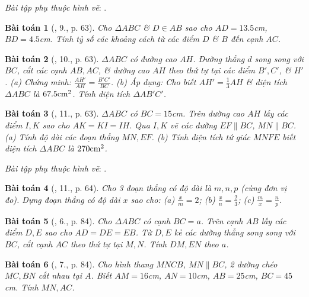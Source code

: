 \documentclass{article}
\newtheorem{baitoan}{Bài toán}
\begin{document}
\textit{Bài tập phụ thuộc hình vẽ}: \cite[?3, 6.--8., pp. 62--63]{SGK_Toan_8_tap_2}.

\begin{baitoan}[\cite{SGK_Toan_8_tap_2}, 9., p. 63]
	Cho $\Delta ABC$ \& $D\in AB$ sao cho $AD = 13.5$\emph{cm}, $BD = 4.5$\emph{cm}. Tính tỷ số các khoảng cách từ các điểm $D$ \& $B$ đến cạnh $AC$.
\end{baitoan}

\begin{baitoan}[\cite{SGK_Toan_8_tap_2}, 10., p. 63]
	$\Delta ABC$ có đường cao $AH$. Đường thẳng $d$ song song với $BC$, cắt các cạnh $AB,AC$, \& đường cao $AH$ theo thứ tự tại các điểm $B',C'$, \& $H'$. (a) Chứng minh: $\frac{AH'}{AH} = \frac{B'C'}{BC}$. (b) Áp dụng: Cho biết $AH' = \frac{1}{3}AH$ \& diện tích $\Delta ABC$ là $67.5{\rm cm}^2$. Tính diện tích $\Delta AB'C'$.
\end{baitoan}

\begin{baitoan}[\cite{SGK_Toan_8_tap_2}, 11., p. 63]
	$\Delta ABC$ có $BC = 15$\emph{cm}. Trên đường cao $AH$ lấy các điểm $I,K$ sao cho $AK = KI = IH$. Qua $I,K$ vẽ các đường $EF\parallel BC$, $MN\parallel BC$. (a) Tính độ dài các đoạn thẳng $MN,EF$. (b) Tính diện tích tứ giác $MNFE$ biết diện tích $\Delta ABC$ là $270{\rm cm}^2$.
\end{baitoan}
\noindent\textit{Bài tập phụ thuộc hình vẽ}: \cite[12.--13., p. 64]{SGK_Toan_8_tap_2}.

\begin{baitoan}[\cite{SGK_Toan_8_tap_2}, 11., p. 64]
	Cho 3 đoạn thẳng có độ dài là $m,n,p$ (cùng đơn vị đo). Dựng đoạn thẳng có độ dài $x$ sao cho: (a) $\frac{x}{m} = 2$; (b) $\frac{x}{n} = \frac{2}{3}$; (c) $\frac{m}{x} = \frac{n}{p}$.
\end{baitoan}

\begin{baitoan}[\cite{SBT_Toan_8_tap_2}, 6., p. 84]
	Cho $\Delta ABC$ có cạnh $BC = a$. Trên cạnh $AB$ lấy các điểm $D,E$ sao cho $AD = DE = EB$. Từ $D,E$ kẻ các đường thẳng song song với $BC$, cắt cạnh $AC$ theo thứ tự tại $M,N$. Tính $DM,EN$ theo $a$.	
\end{baitoan}

\begin{baitoan}[\cite{SBT_Toan_8_tap_2}, 7., p. 84]
	Cho hình thang $MNCB$, $MN\parallel BC$, 2 đường chéo $MC,BN$ cắt nhau tại $A$. Biết $AM = 16$\emph{cm}, $AN = 10$\emph{cm}, $AB = 25$\emph{cm}, $BC = 45$\emph{cm}. Tính $MN,AC$.
\end{baitoan}
\end{document}
